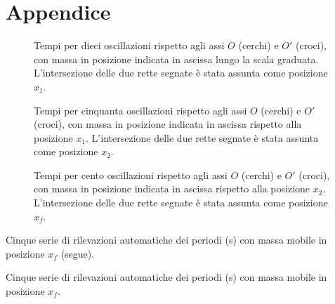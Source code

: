 \documentclass[italian,a4paper]{article}
\begin{document}
\section{Appendice}
\begin{figure}[hp]\caption{Tempi per dieci oscillazioni rispetto agli assi $O$ (cerchi) e $O'$ (croci), con massa in posizione indicata in ascissa lungo la scala graduata. L'intersezione delle due rette segnate è stata assunta come posizione $x_1$.}\label{course}
\centering
 
\end{figure}
\begin{figure}[hp]\caption{Tempi per cinquanta oscillazioni rispetto agli assi $O$ (cerchi) e $O'$ (croci), con massa in posizione indicata in ascissa rispetto alla posizione $x_1$. L'intersezione delle due rette segnate è stata assunta come posizione $x_2$.}\label{medium}
\centering
 
\end{figure}
\begin{figure}[hp]\caption{Tempi per cento oscillazioni rispetto agli assi $O$ (cerchi) e $O'$ (croci), con massa in posizione indicata in ascissa rispetto alla posizione $x_2$. L'intersezione delle due rette segnate è stata assunta come posizione $x_f$.}\label{fine}
\centering
 
\end{figure}
\begin{table}[p]\caption{Cinque serie di rilevazioni automatiche dei periodi (\unit{s}) con massa mobile in posizione $x_f$ (segue).}\label{auto}
\centering \small

\end{table}
\begin{table}[p]\caption{Cinque serie di rilevazioni automatiche dei periodi (\unit{s}) con massa mobile in posizione $x_f$.}
\centering \small

\end{table}
\end{document}
